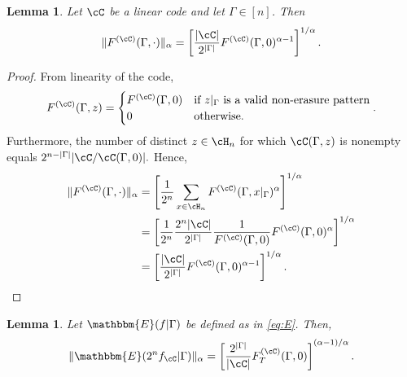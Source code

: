 \documentclass{amsart}
\newtheorem{lemma}[theorem]{Lemma}
\theoremstyle{remark}
\begin{document}
\begin{lemma}\label{lemma: Collision function- norms}
 Let $\cC$ be a linear code and let $\Gamma \in [n]$. Then
    \begin{align*} %
        \|F^{(\cC)}(\Gamma,\cdot)\|_\alpha =  \left[  \frac{|\cC|}{2^{|\Gamma|}} F^{(\cC)}(\Gamma,0)^{\alpha -1}\right]^{1/{\alpha} }.
    \end{align*}
\end{lemma}
\begin{proof} 

From linearity of the code, 
\begin{equation*}
    F^{(\cC)}(\Gamma,z) = 
\begin{cases}
            F^{(\cC)}(\Gamma,0)  & \mbox{if } z|_{\Gamma} \mbox{ is a valid non-erasure pattern}\\
            0 & \mbox{otherwise.} 
	\end{cases}.
\end{equation*}
Furthermore, the number of distinct $z\in\cH_n$ for which $\cC(\Gamma,z)$ is nonempty equals 
  $
  2^{n-|\Gamma|}|\cC/\cC(\Gamma,0)|.
  $ 
  Hence,
    \begin{align*}
        \|F^{(\cC)}(\Gamma,\cdot)\|_{\alpha}  &= \left[ \frac{1}{2^n} \sum_{x\in \cH_n} F^{(\cC)}(\Gamma,x|_\Gamma)^{\alpha} \right]^{1/{\alpha} }\\
        & = \left[ \frac{1}{2^n} \frac{2^n |\cC|}{2^{|\Gamma|}} \frac{1}{F^{(\cC)}(\Gamma,0)} F^{(\cC)}(\Gamma,0)^{\alpha} \right]^{1/{\alpha} }\\
        & = \left[  \frac{|\cC|}{2^{|\Gamma|}} F^{(\cC)}(\Gamma,0)^{\alpha -1}\right]^{1/{\alpha} }.
    \end{align*}
\end{proof}
\begin{lemma}\label{lemma: Collision function - LHS of 3.4}
Let $\mathbbm{E}(f|\Gamma)$ be defined as in \eqref{eq:E}. Then,
    \begin{align*}
     \|\mathbbm{E}(2^nf_{\cC}|\Gamma)\|_{\alpha}  
         &=  \left[ \frac{2^{|\Gamma|}}{|\cC|} F^{(\cC)}_T(\Gamma,0) \right]^{(\alpha -1)/{\alpha} }.\\        
    \end{align*}
\end{lemma}
\end{document}
